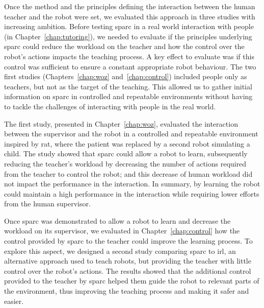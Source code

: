 Once the method and the principles defining the interaction between the human teacher and the robot were set, we evaluated this approach in three studies with increasing ambition. Before testing \gls{sparc} in a real world interaction with people (in Chapter~\ref{chap:tutoring}), we needed to evaluate if the principles underlying \gls{sparc} could reduce the workload on the teacher and how the control over the robot's actions impacts the teaching process. A key effect to evaluate was if this control was sufficient to ensure a constant appropriate robot behaviour. The two first studies (Chapters~\ref{chap:woz} and~\ref{chap:control}) included people only as teachers, but not as the target of the teaching. This allowed us to gather initial information on \gls{sparc} in controlled and repeatable environments without having to tackle the challenges of interacting with people in the real world.

The first study, presented in Chapter~\ref{chap:woz}, evaluated the interaction between the supervisor and the robot in a controlled and repeatable environment inspired by \gls{rat}, where the patient was replaced by a second robot simulating a child. The study showed that \gls{sparc} could allow a robot to learn, subsequently reducing the teacher's workload by decreasing the number of actions required from the teacher to control the robot; and this decrease of human workload did not impact the performance in the interaction. In summary, by learning the robot could maintain a high performance in the interaction while requiring lower efforts from the human supervisor.

Once \gls{sparc} was demonstrated to allow a robot to learn and decrease the workload on its supervisor, we evaluated in Chapter~\ref{chap:control} how the control provided by \gls{sparc} to the teacher could improve the learning process. To explore this aspect, we designed a second study comparing \gls{sparc} to \gls{irl}, an alternative approach used to teach robots, but providing the teacher with little control over the robot's actions. The results showed that the additional control provided to the teacher by \gls{sparc} helped them guide the robot to relevant parts of the environment, thus improving the teaching process and making it safer and easier.

